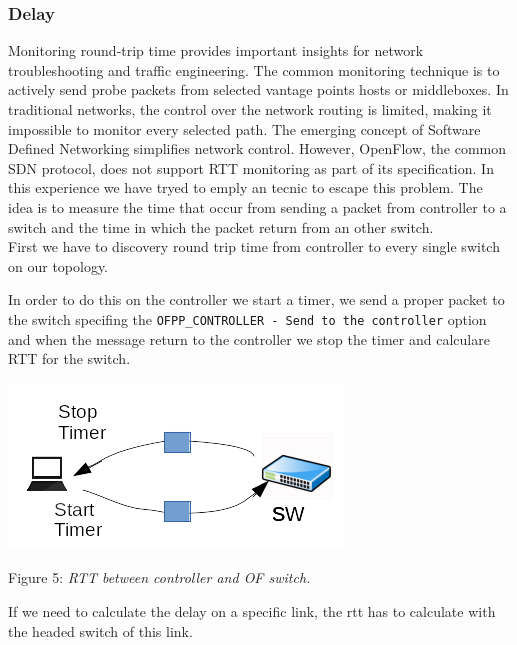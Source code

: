 \documentclass[article,10pt]{IEEEtran}
\begin{document}
\subsubsection{Delay}
Monitoring round-trip time provides important insights for network troubleshooting and traffic engineering.
The  common  monitoring  technique  is  to  actively  send  probe packets  from  selected  vantage  points  hosts  or  middleboxes.
In traditional  networks, the control over the network routing is
limited,  making  it  impossible  to  monitor  every  selected  path. The  emerging  concept  of  Software  Defined  Networking  simplifies
network  control.  However,  OpenFlow,  the  common  SDN protocol,   does   not   support   RTT   monitoring   as   part   of   its
specification. In this experience we have tryed to emply an tecnic to escape this problem\cite{rtt}.
\newline The idea is to measure the time that occur from sending a packet from controller to a switch and the time in which the packet return from
an other switch.
\\
\newline First we have to discovery round trip time from controller to every single switch on our topology.

In order to do this on the controller we start a timer, we send a proper packet to the switch specifing the \texttt{OFPP_CONTROLLER - Send to the controller}
option and when the message return to the controller we stop the timer and calculare RTT for the switch.
\begin{center}
 \centering
 \includegraphics[scale=0.70]{images/rtt2.png}
 
 \label{fig:topo}

\end{center}

\begin{center}
 {Figure 5: \emph{RTT between controller and OF switch.}}
\end{center}


If we need to calculate the delay on a specific link, the rtt has to calculate with the headed switch of this link.
\end{document}
